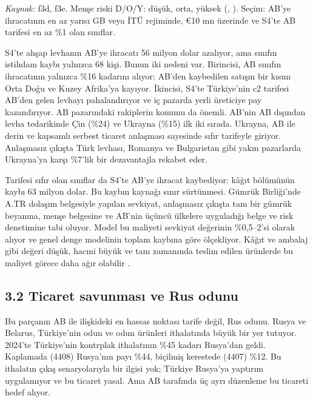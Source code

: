 \endgroup

\emph{Kaynak:} \etiketT{} f3d, f3e. Menşe riski D/O/Y: düşük, orta, yüksek (, \etiketH{}). Seçim: AB'ye ihracatının en az yarısı GB veya İTÜ rejiminde, €10 mn üzerinde ve S4'te AB tarifesi en az \%1 olan sınıflar.

S4'te ahşap levhanın AB'ye ihracatı 56 milyon dolar azalıyor, ama sınıfın istihdam kaybı yalnızca 68 kişi. Bunun iki nedeni var. Birincisi, AB sınıfın ihracatının yalnızca \%16 kadarını alıyor; AB'den kaybedilen satışın bir kısmı Orta Doğu ve Kuzey Afrika'ya kayıyor. İkincisi, S4'te Türkiye'nin c2 tarifesi AB'den gelen levhayı pahalandırıyor ve iç pazarda yerli üreticiye pay kazandırıyor. AB pazarındaki rakiplerin konumu da önemli. AB'nin AB dışından levha tedarikinde Çin (\%24) ve Ukrayna (\%15) ilk iki sırada. Ukrayna, AB ile derin ve kapsamlı serbest ticaret anlaşması sayesinde sıfır tarifeyle giriyor. Anlaşmasız çıkışta Türk levhası, Romanya ve Bulgaristan gibi yakın pazarlarda Ukrayna'ya karşı \%7'lik bir dezavantajla rekabet eder.

Tarifesi sıfır olan sınıflar da S4'te AB'ye ihracat kaybediyor: kâğıt bölümünün kaybı 63 milyon dolar. Bu kaybın kaynağı sınır sürtünmesi. Gümrük Birliği'nde A.TR dolaşım belgesiyle yapılan sevkiyat, anlaşmasız çıkışta tam bir gümrük beyanına, menşe belgesine ve AB'nin üçüncü ülkelere uyguladığı belge ve risk denetimine tabi oluyor. Model bu maliyeti sevkiyat değerinin \%0,5--2'si olarak alıyor ve genel denge modelinin toplam kaybına göre ölçekliyor. Kâğıt ve ambalaj gibi değeri düşük, hacmi büyük ve tam zamanında teslim edilen ürünlerde bu maliyet görece daha ağır olabilir \etiketH{}.

\hypertarget{nace_kartlar_16-18-32-ticaret-savunmasux131-ve-rus-odunu}{%
\subsection{3.2 Ticaret savunması ve Rus odunu}\label{nace_kartlar_16-18-32-ticaret-savunmasux131-ve-rus-odunu}}

Bu parçanın AB ile ilişkideki en hassas noktası tarife değil, Rus odunu. Rusya ve Belarus, Türkiye'nin odun ve odun ürünleri ithalatında büyük bir yer tutuyor. 2024'te Türkiye'nin kontrplak ithalatının \%45 kadarı Rusya'dan geldi. Kaplamada (4408) Rusya'nın payı \%44, biçilmiş kerestede (4407) \%12. Bu ithalatın çıkış senaryolarıyla bir ilgisi yok; Türkiye Rusya'ya yaptırım uygulamıyor ve bu ticaret yasal. Ama AB tarafında üç ayrı düzenleme bu ticareti hedef alıyor.

